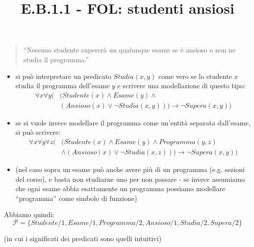 \documentclass[12pt]{article}
\title{E.B.1.1 - FOL: studenti ansiosi}
\author{}
\date{}
\begin{document}
\maketitle
\vspace{-5em}

\begin{quote}
``Nessuno studente supererà un qualunque esame se è ansioso o non ne studia il programma.''
\end{quote}

\begin{itemize}
    \item si può interpretare un predicato $Studia(x, y)$ come vero se lo studente $x$ studia il programma dell'esame $y$ e scrivere una modellazione di questo tipo:
\begin{align*}
    \forall x \forall y (& \bigr(Studente(x) \land Esame(y) \land \\
                       &(Ansioso(x) \lor \neg Studia(x, y))\bigr) \to \neg Supera(x, y) )
\end{align*}

    \item se si vuole invece modellare il programma come un'entità separata dall'esame, si può scrivere:
\begin{align*}
    \forall x \forall y \forall z (& \bigr(Studente(x) \land Esame(y) \land Programma(y, z)\\
                                   &\land (Ansioso(x) \lor \neg Studia(x, z))\bigr) \to \neg Supera(x, y) )
\end{align*}
\item (nel caso sopra un esame può anche avere più di un programma (e.g. sezioni del corso), e basta non studiarne uno per non passare - se invece assumiamo che ogni esame abbia esattamente un programma possiamo modellare ``programma'' come simbolo di funzione)
\end{itemize}

Abbiamo quindi:
$$\mathcal{P} = \{ Studente/1, Esame/1, Programma/2, Ansioso/1, Studia/2, Supera/2 \}$$

(in cui i significati dei predicati sono quelli intuitivi)
\end{document}

